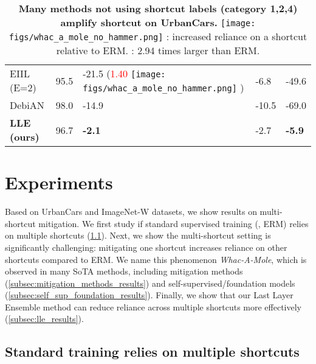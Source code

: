 \documentclass[10pt,twocolumn,letterpaper]{article}
\DeclareRobustCommand{\molenohammer}{\begingroup\normalfont
  \texttt{[image: figs/whac\_a\_mole\_no\_hammer.png]}\endgroup
}
\begin{document}
\begin{table}[t]
\begin{adjustbox}{width=\linewidth}
\begin{tabular}{@{}lclll@{}}
EIIL (E=2)          & 95.5                                   & -21.5 (\textcolor{red}{1.40} \molenohammer)        & -6.8          & -49.6         \\
DebiAN              & 98.0                                   & -14.9         & -10.5         & -69.0         \\ \midrule \midrule
\textbf{LLE (ours)} & 96.7                                   & \textbf{-2.1} & -2.7 & \textbf{-5.9} \\ \bottomrule
\end{tabular}
\end{adjustbox}
\caption{\textbf{Many methods not using shortcut labels (category 1,2,4) amplify shortcut on UrbanCars.} \molenohammer: increased reliance on a shortcut relative to ERM. : 2.94 times larger than ERM.
}
\label{tab:urbancars_unsupervised_results}
\vspace{-4mm}
\end{table}

\section{Experiments}
\label{sec:experiment}


Based on UrbanCars and ImageNet-W datasets, we show results on multi-shortcut mitigation.
We first study if standard supervised training (\ie, ERM) relies on multiple shortcuts (\cref{subsec:standard_training}).
Next, we show the multi-shortcut setting is significantly challenging: mitigating one shortcut increases reliance on other shortcuts compared to ERM.
We name this phenomenon \emph{Whac-A-Mole}, which is observed in many SoTA methods, including mitigation methods (\cref{subsec:mitigation_methods_results}) and self-supervised/foundation models (\cref{subsec:self_sup_foundation_results}).
Finally, we show that our Last Layer Ensemble method can reduce reliance across multiple shortcuts more effectively (\cref{subsec:lle_results}).


\subsection{Standard training relies on multiple shortcuts}
\label{subsec:standard_training}
\end{document}
